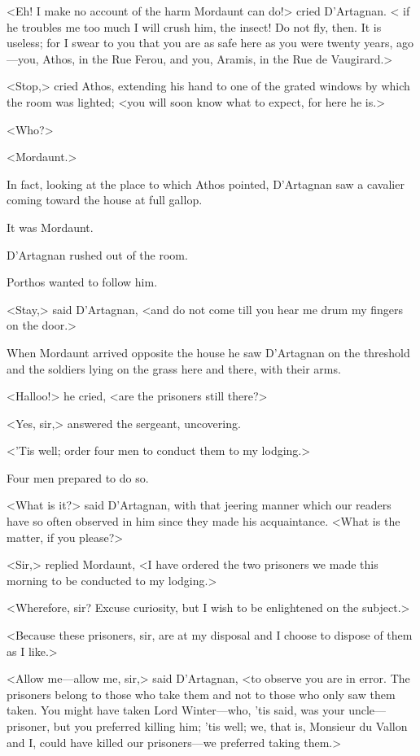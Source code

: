<Eh! I make no account of the harm Mordaunt can do!> cried D'Artagnan. < if he troubles me too much I will crush him, the insect! Do not fly, then. It is useless; for I swear to you that you are as safe here as you were twenty years, ago—you, Athos, in the Rue Ferou, and you, Aramis, in the Rue de Vaugirard.>

<Stop,> cried Athos, extending his hand to one of the grated windows by which the room was lighted; <you will soon know what to expect, for here he is.>

<Who?>

<Mordaunt.>

In fact, looking at the place to which Athos pointed, D'Artagnan saw a cavalier coming toward the house at full gallop.

It was Mordaunt.

D'Artagnan rushed out of the room.

Porthos wanted to follow him.

<Stay,> said D'Artagnan, <and do not come till you hear me drum my fingers on the door.>

When Mordaunt arrived opposite the house he saw D'Artagnan on the threshold and the soldiers lying on the grass here and there, with their arms.

<Halloo!> he cried, <are the prisoners still there?>

<Yes, sir,> answered the sergeant, uncovering.

<'Tis well; order four men to conduct them to my lodging.>

Four men prepared to do so.

<What is it?> said D'Artagnan, with that jeering manner which our readers have so often observed in him since they made his acquaintance. <What is the matter, if you please?>

<Sir,> replied Mordaunt, <I have ordered the two prisoners we made this morning to be conducted to my lodging.>

<Wherefore, sir? Excuse curiosity, but I wish to be enlightened on the subject.>

<Because these prisoners, sir, are at my disposal and I choose to dispose of them as I like.>

<Allow me—allow me, sir,> said D'Artagnan, <to observe you are in error. The prisoners belong to those who take them and not to those who only saw them taken. You might have taken Lord Winter—who, 'tis said, was your uncle—prisoner, but you preferred killing him; 'tis well; we, that is, Monsieur du Vallon and I, could have killed our prisoners—we preferred taking them.>

